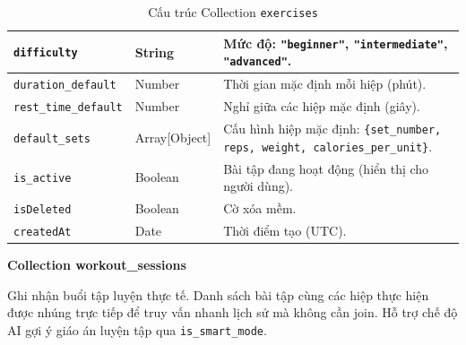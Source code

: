 \begin{table}[H]
\begin{tabularx}{\textwidth}{|p{3.8cm}|p{2.6cm}|X|}
\rowcolor{dbrowalt}
\texttt{difficulty}       & String        & Mức độ: \texttt{"beginner"}, \texttt{"intermediate"}, \texttt{"advanced"}. \\ \hline
\texttt{duration\_default} & Number        & Thời gian mặc định mỗi hiệp (phút). \\ \hline
\rowcolor{dbrowalt}
\texttt{rest\_time\_default} & Number       & Nghỉ giữa các hiệp mặc định (giây). \\ \hline
\texttt{default\_sets}     & Array[Object] & Cấu hình hiệp mặc định: \texttt{\{set\_number, reps, weight, calories\_per\_unit\}}. \\ \hline
\rowcolor{dbrowalt}
\texttt{is\_active}        & Boolean       & Bài tập đang hoạt động (hiển thị cho người dùng). \\ \hline
\texttt{isDeleted}        & Boolean       & Cờ xóa mềm. \\ \hline
\rowcolor{dbrowalt}
\texttt{createdAt}        & Date          & Thời điểm tạo (UTC). \\ \hline
\end{tabularx}
\caption{Cấu trúc Collection \texttt{exercises}}
\label{tab:col_exercises}
\end{table}

\textbf{Collection workout\_sessions}
\label{subsec:col_workout_sessions}

Ghi nhận buổi tập luyện thực tế. Danh sách bài tập cùng các hiệp thực hiện được nhúng trực tiếp để truy vấn nhanh lịch sử mà không cần join. Hỗ trợ chế độ AI gợi ý giáo án luyện tập qua \texttt{is\_smart\_mode}.

